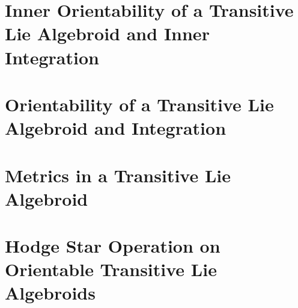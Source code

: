 \section{Inner Orientability of a Transitive Lie Algebroid and Inner Integration}

\section{Orientability of a Transitive Lie Algebroid and Integration}

\section{Metrics in a Transitive Lie Algebroid}

\section{Hodge Star Operation on Orientable Transitive Lie Algebroids}

